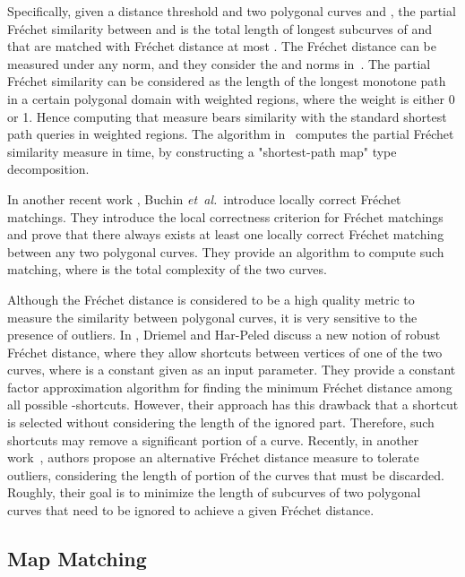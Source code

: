 \documentclass[12pt]{dalthesis}
\newcommand{\etal}{{\em et~al.\/}}
\newcommand{\Frechet}{Fr\'echet }
\begin{document}
Specifically, given a distance threshold  and two polygonal 
curves  and , the partial \Frechet similarity between  and  is the total length
of longest subcurves of  and  that are matched with
\Frechet distance at most . The \Frechet distance 
can be measured under any  norm, and they consider the  and
 norms in~\cite{ExactPartial}.
The partial \Frechet similarity can be considered as
the length of the longest monotone path in a certain
polygonal domain with weighted regions, where the
weight is either 0 or 1. Hence computing that measure
bears similarity with the standard shortest path queries
in weighted regions. The algorithm in~\cite{ExactPartial} computes 
the partial \Frechet similarity measure in  time, by constructing a "shortest-path map" type decomposition.

In another recent work \cite{BuchinLocallyFrechet}, 
Buchin \etal~introduce locally correct \Frechet matchings. They introduce the local correctness criterion for \Frechet matchings and prove
that there always exists at least one locally correct \Frechet matching between any
two polygonal curves. They provide an 
 algorithm to compute
such matching, where
 is the total complexity of the two curves.


Although the \Frechet distance is considered to be a high quality metric to measure
the similarity between polygonal curves, it is very sensitive to the presence of outliers. 
In \cite{Jaywalking}, Driemel and Har-Peled
discuss a new notion of robust \Frechet distance, 
where they allow  shortcuts between vertices of one
of the two curves, where  
is a constant given as an input parameter.
They provide a constant factor
approximation algorithm for finding the minimum 
\Frechet distance among all possible -shortcuts.
However, their approach has this 
drawback that a shortcut is selected without considering the length of the ignored part. Therefore, such shortcuts may remove a significant portion of a curve.
Recently, in another work~\cite{SackAminPaper}, 
authors propose
an alternative \Frechet distance measure to tolerate outliers,
considering the length of portion of the curves that must 
be discarded. Roughly, their goal is to minimize the length of 
subcurves of two polygonal curves that need to be ignored to achieve a given  \Frechet distance.


\subsection{Map Matching}
\label{sec:RelatedMapMatching}
\end{document}
